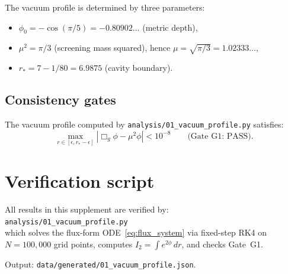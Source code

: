 \documentclass[11pt,letterpaper]{article}
\numberwithin{equation}{section}
\begin{document}
The vacuum profile is determined by three parameters:
\begin{itemize}
  \item $\phi_0 = -\cos(\pi/5) = -0.80902\ldots$ (metric depth),
  \item $\mu^2 = \pi/3$ (screening mass squared), hence $\mu = \sqrt{\pi/3} = 1.02333\ldots$,
  \item $r_* = 7 - 1/80 = 6.9875$ (cavity boundary).
\end{itemize}

\subsection{Consistency gates}

The vacuum profile computed by \texttt{analysis/01\_vacuum\_profile.py}
satisfies:
\begin{equation}
  \max_{r\in[\epsilon, r_*-\epsilon]}\left|\Box_g\phi - \mu^2\phi\right| < 10^{-8}
  \qquad \text{(Gate G1: PASS)}.
\end{equation}

\section{Verification script}
\label{sec:verification}

All results in this supplement are verified by:\\
\texttt{analysis/01\_vacuum\_profile.py}\\
which solves the flux-form ODE~\eqref{eq:flux_system} via fixed-step RK4
on $N = 100{,}000$ grid points, computes $I_2 = \int e^{2\phi}\,dr$,
and checks Gate~G1.

Output: \texttt{data/generated/01\_vacuum\_profile.json}.
\end{document}
